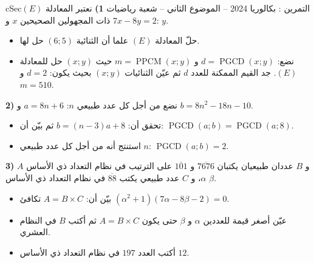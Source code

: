\documentclass[12pt,a4paper]{article}
\newenvironment{BOX}[2]{\begin{otherlanguage}{english}\begin{arbox}{#1}{#2}}{\end{arbox}\end{otherlanguage}}
\newcounter{exo}
\newenvironment{tamrin}[1]{\stepcounter{exo}\begin{BOX}{cSec}{التمرين \theexo: #1}}{\end{BOX}}
\newcommand{\pgcd}{\operatorname{PGCD}}
\newcommand{\ppcm}{\operatorname{PPCM}}
\newenvironment{sq}{\begin{itemize}[leftmargin=2.4em,itemsep=3pt]}{\end{itemize}}
\newcommand{\qa}{\item[(أ)]}\newcommand{\qb}{\item[(ب)]}\newcommand{\qc}{\item[(جـ)]}\newcommand{\qd}{\item[(د)]}\newcommand{\qe}{\item[(هـ)]}
\begin{document}
\begin{tamrin}{بكالوريا 2024 -- الموضوع الثاني -- شعبة رياضيات}
\textbf{1)} نعتبر المعادلة $(E)$:\quad $7x-8y=2$ ذات المجهولين الصحيحين $x$ و $y$.
\begin{sq}
\qa حلّ المعادلة $(E)$ علما أن الثنائية $(6;5)$ حل لها.
\qb نضع: $d=\pgcd(x;y)$ و $m=\ppcm(x;y)$ حيث $(x;y)$ حل للمعادلة $(E)$.
جد القيم الممكنة للعدد $d$ ثم عيّن الثنائيات $(x;y)$ بحيث يكون: $d=2$ و $m=510$.
\end{sq}
\textbf{2)} نضع من أجل كل عدد طبيعي $n$: $a=8n+6$ و $b=8n^2-18n-10$.
\begin{sq}
\qa تحقق أن: $b=(n-3)a+8$ ثم بيّن أن: $\pgcd(a;b)=\pgcd(a;8)$.
\qb استنتج أنه من أجل كل عدد طبيعي $n$: $\pgcd(a;b)=2$.
\end{sq}
\textbf{3)} $A$ و $B$ عددان طبيعيان يكتبان $\overline{7676}$ و $\overline{101}$ على الترتيب في نظام التعداد ذي الأساس $\alpha$، و $C$ عدد طبيعي يكتب $\overline{88}$ في نظام التعداد ذي الأساس $\beta$.
\begin{sq}
\qa بيّن أن: $A=B\times C$ تكافئ $(\alpha^2+1)(7\alpha-8\beta-2)=0$.
\qb عيّن أصغر قيمة للعددين $\alpha$ و $\beta$ حتى يكون $A=B\times C$ ثم أكتب $B$ في النظام العشري.
\qc أكتب العدد $197$ في نظام التعداد ذي الأساس $12$.
\end{sq}
\end{tamrin}
\end{document}
